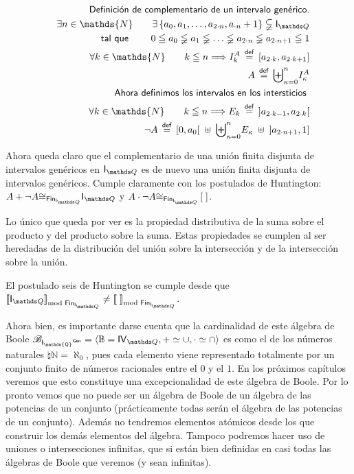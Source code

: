 \documentclass[final,12pt,a4paper,twoside,fleqn]{extbook}
\newcommand{\sthen}{\ensuremath{\Longrightarrow}}
\newcommand{\mathdef}{\ensuremath{\stackrel{\mathsf{def}}{{}={}}}}
\newcommand{\then}{\ensuremath{\sthen}}
\newcommand{\set}[1]{\ensuremath{\left\lbrace{#1}\right\rbrace}}
\newcommand{\setN}{\ensuremath{\mathds{N}}}
\newcommand{\setQ}{\ensuremath{\mathds{Q}}}
\newcommand{\setB}{\ensuremath{\mathbb{B}}}
\theoremstyle{definition}
\theoremstyle{remark}
\begin{document}
\begin{eqnarray}\nonumber
&&\textsf{Definición de complementario de un intervalo genérico.}\\
&&\exists n \in \setN \qquad \exists \set{a_0,a_1,\ldots,a_{2 \cdot n},a_{ \cdot n} + 1} \subsetneqq \IQ\\
&&\textsf{ tal que } \qquad 0 \leqq a_0 \lneqq a_1 \lneqq \ldots \lneqq a_{2 \cdot n} \lneqq a_{{2 \cdot n} + 1} \leqq 1\\
&&\forall k \in \setN \qquad k \leqq n \then I_k^A \mathdef \left[a_{2 \cdot k},a_{{2 \cdot k} + 1}\right]\\
&& A \mathdef {\biguplus}_{\kappa = 0}^{n} I_{\kappa}^A\\ \nonumber
&&\textsf{Ahora definimos los intervalos en los intersticios }\\
&&\forall k \in \setN \qquad k \leqq n \then E_k \mathdef \left]a_{2 \cdot k - 1},a_{2 \cdot k}\right[\\
&& \neg A \mathdef \left[0,a_0\right[\; \uplus\; {\biguplus}_{\kappa = 0}^{n} E_{\kappa}\; \uplus \; \left]a_{2 \cdot n + 1},1\right]
\end{eqnarray}



	Ahora queda claro que el complementario de una unión finita disjunta de
intervalos genéricos en \(\IQ\) es de nuevo una unión finita disjunta de
intervalos genéricos. Cumple claramente con los postulados de Huntington: \(A
+ \neg A {\cong}_{{\mathsf{Fin}}_{\IQ}} \IQ\) y \(A \cdot \neg A
{\cong}_{{\mathsf{Fin}}_{\IQ}} \left[\;\right]\).



	Lo único que queda por ver es la propiedad distributiva de la suma sobre
el producto y del producto sobre la suma. Estas propiedades se cumplen al ser
heredadas de la distribución del unión sobre la intersección y de la
intersección sobre la unión.





	El postulado seis de Huntington se cumple desde que
\(\ClEqFinDiffInter{\IQ} \neq \ClEqFinDiffInter{\;}\).



	Ahora bien, es importante darse cuenta que la cardinalidad de este
álgebra de Boole \( {\mathscr{B}}_{\mathsf{I_\setQ}^\mathsf{Gen}} = \langle
\setB = \IVQ , + \simeq \cup , \cdot \simeq \cap \rangle \) es como el de los
números naturales \( \natural\setN = {\aleph}_0 \), pues cada elemento viene
representado totalmente por un conjunto finito de números racionales entre el
\(0\) y el \(1\). En los próximos capítulos veremos que esto constituye una
excepcionalidad de este álgebra de Boole. Por lo pronto vemos que no puede
ser un álgebra de Boole de un álgebra de las potencias de un conjunto
(prácticamente todas serán el álgebra de las potencias de un conjunto).
Además no tendremos elementos atómicos desde los que construir los demás
elementos del álgebra. Tampoco podremos hacer uso de uniones o intersecciones
infinitas, que si están bien definidas en casi todas las álgebras de Boole
que veremos (y sean infinitas).
\end{document}
